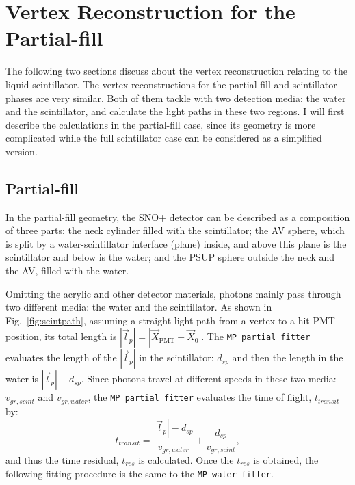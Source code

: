 \section{Vertex Reconstruction for the Partial-fill}\label{sect:partialFitter}
The following two sections discuss about the vertex reconstruction relating to the liquid scintillator. The vertex reconstructions for the partial-fill and scintillator phases are very similar. Both of them tackle with two detection media: the water and the scintillator, and calculate the light paths in these two regions. I will first describe the calculations in the partial-fill case, since its geometry is more complicated while the full scintillator case can be considered as a simplified version.

\subsection{Partial-fill}
In the partial-fill geometry, the SNO+ detector can be described as a composition of three parts: the neck cylinder filled with the scintillator; the AV sphere, which is split by a water-scintillator interface (plane) inside, and above this plane is the scintillator and below is the water; and the PSUP sphere outside the neck and the AV, filled with the water.

Omitting the acrylic and other detector materials, photons mainly pass through two different media: the water and the scintillator. As shown in Fig.~\ref{fig:scintpath}, assuming a straight light path from a vertex to a hit PMT position, its total length is $|\vec{l}_p|=|\vec{X}_\mathrm{PMT}-\vec{X}_0|$. The \texttt{MP partial fitter} evaluates the length of the $|\vec{l}_p|$ in the scintillator: $d_{sp}$ and then the length in the water is $|\vec{l}_p|-d_{sp}$. Since photons travel at different speeds in these two media: $v_{gr,scint}$ and $v_{gr,water}$, the \texttt{MP partial fitter} evaluates the time of flight, $t_{transit}$ by:
\begin{equation}
t_{transit} = \frac{|\vec{l}_p|-d_{sp}}{v_{gr,water}} +\frac{d_{sp}}{v_{gr,scint}},
\end{equation}
and thus the time residual, $t_{res}$ is calculated. Once the $t_{res}$ is obtained, the following fitting procedure is the same to the \texttt{MP water fitter}.

